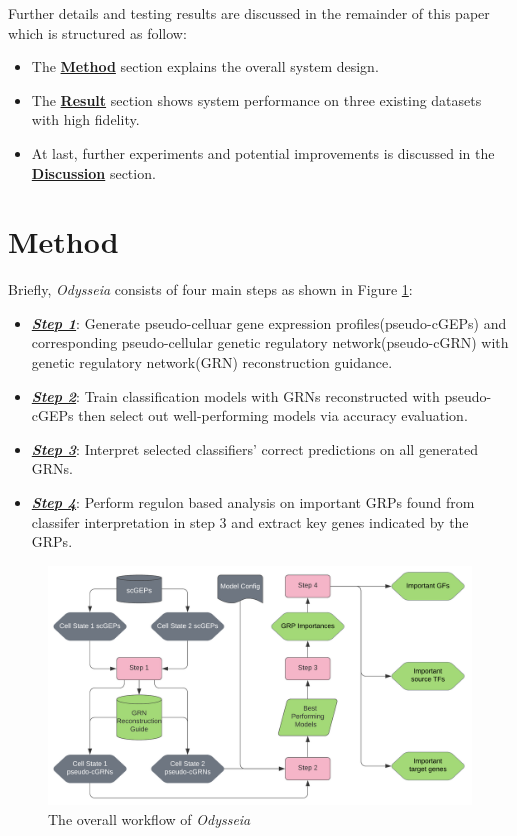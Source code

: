 \documentclass[fleqn,10pt]{wlscirep}
\begin{document}
Further details and testing results are discussed in the remainder of this paper which is structured as follow:
\begin{itemize}
\setlength\itemsep{0em}
\item{}
The {\hyperref[method]{\textbf{Method}}} section explains the overall system design.
\item{}
The {\hyperref[res]{\textbf{Result}}} section shows system performance on three existing datasets with high fidelity.
\item{}
At last, further experiments and potential improvements is discussed in the {\hyperref[disc]{\textbf{Discussion}}} section.
\end{itemize}

\section*{Method}
\label{method}
Briefly, \emph{Odysseia} consists of four main steps as shown in Figure \ref{odysseia}:
\begin{itemize}
  \item \hyperref[step1]{\textbf{\emph{Step 1}}}: Generate pseudo-celluar gene expression profiles(pseudo-cGEPs) and corresponding pseudo-cellular genetic regulatory network(pseudo-cGRN) with genetic regulatory network(GRN) reconstruction guidance.
  \item \hyperref[step2]{\textbf{\emph{Step 2}}}: Train classification models with GRNs reconstructed with pseudo-cGEPs then select out well-performing models via accuracy evaluation.
  \item \hyperref[step3]{\textbf{\emph{Step 3}}}: Interpret selected classifiers' correct predictions on all generated GRNs.
  \item \hyperref[step4]{\textbf{\emph{Step 4}}}: Perform regulon based analysis on important GRPs found from classifer interpretation in step 3 and extract key genes indicated by the GRPs.
\end{itemize}


\begin{figure}[ht]
\centering
\includegraphics[width=0.8\linewidth]{image/Odysseia.png}
\caption{The overall workflow of \emph{Odysseia}}
\label{odysseia}
\end{figure}
\end{document}
